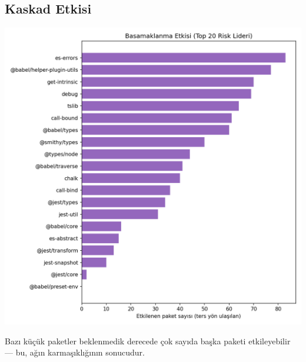 \documentclass[11pt,a4paper]{article}
\begin{document}
\subsection{Kaskad Etkisi}
\includegraphics{cascade_impact_top20.png}
\begin{tipbox}
Bazı küçük paketler beklenmedik derecede çok sayıda başka paketi etkileyebilir — bu, ağın karmaşıklığının sonucudur.
\end{tipbox}
\end{document}
